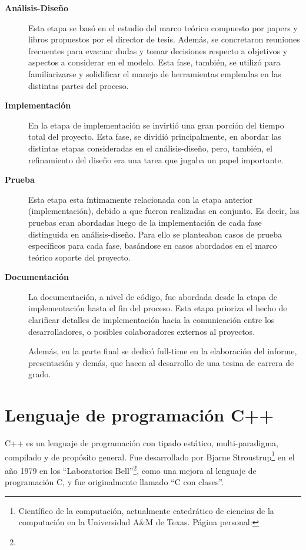 \begin{description}
\item[\textbf{Análisis-Diseño}] Esta etapa se basó en el estudio del marco teórico compuesto por papers y libros propuestos por el director de tesis. Además, se concretaron reuniones frecuentes para evacuar dudas y tomar decisiones respecto a objetivos y aspectos a considerar en el modelo. Esta fase, también, se utilizó para familiarizarse y solidificar el manejo de herramientas empleadas en las distintas partes del proceso. 

\item[\textbf{Implementación}] En la etapa de implementación se invirtió una gran porción del tiempo total del proyecto. Esta fase, se dividió principalmente, en abordar las distintas etapas consideradas en el análisis-diseño, pero, también, el refinamiento del diseño era una tarea que jugaba un papel importante.

\item[\textbf{Prueba}] Esta etapa esta íntimamente relacionada con la etapa anterior (implementación), debido a que fueron realizadas en conjunto. Es decir, las pruebas eran abordadas luego de la implementación de cada fase distinguida en análisis-diseño. Para ello se planteaban casos de prueba específicos para cada fase, basándose en casos abordados en el marco teórico soporte del proyecto.

\item[\textbf{Documentación}] La documentación, a nivel de código, fue abordada desde la etapa de implementación hasta el fin del proceso. Esta etapa prioriza el hecho de clarificar detalles de implementación hacia la comunicación entre los desarrolladores, o posibles colaboradores externos al proyectos.

Además, en la parte final se dedicó full-time en la elaboración del informe, presentación y demás, que hacen al desarrollo de una tesina de carrera de grado.
\end{description}

\section{Lenguaje de programación C++}
C++ es un lenguaje de programación con tipado estático, multi-paradigma, compilado y de propósito general. Fue desarrollado por Bjarne Stroustrup\footnote{Científico de la computación, actualmente catedrático de ciencias de la computación en la Universidad A\&M de Texas. Página personal: } en el año 1979 en los ``Laboratorios Bell''\footnote{}, como una mejora al lenguaje de programación C, y fue originalmente llamado ``C con clases''.

